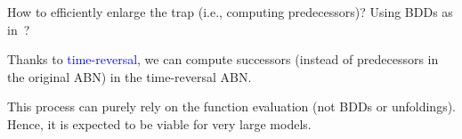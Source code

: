 \documentclass{beamer}              %
\newcommand{\blue}[1]{\textcolor{blue}{#1}}
\begin{document}
\begin{frame}
\hspace{0.8cm}

How to efficiently enlarge the trap (i.e., computing predecessors)?
Using BDDs as in~\cite{DBLP:journals/bioinformatics/GargCXMM08, DBLP:conf/cav/BenesBPS21}?

\hspace{0.8cm}

Thanks to \blue{time-reversal}, we can compute successors (instead of predecessors in the original ABN) in the time-reversal ABN.

\hspace{0.8cm}

This process can purely rely on the function evaluation (not BDDs or unfoldings).
Hence, it is expected to be viable for very large models.
\end{frame}
\end{document}
